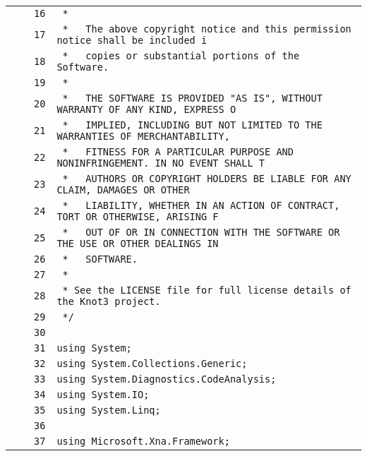 \documentclass[a4paper,10pt]{article}
\begin{document}
\begin{longtable}[l]{lrrl}
\cellcolor{gray} &  & \verb~16~ & \verb~ *~\\
\cellcolor{gray} &  & \verb~17~ & \verb~ *   The above copyright notice and this permission notice shall be included i~\\
\cellcolor{gray} &  & \verb~18~ & \verb~ *   copies or substantial portions of the Software.~\\
\cellcolor{gray} &  & \verb~19~ & \verb~ *~\\
\cellcolor{gray} &  & \verb~20~ & \verb~ *   THE SOFTWARE IS PROVIDED "AS IS", WITHOUT WARRANTY OF ANY KIND, EXPRESS O~\\
\cellcolor{gray} &  & \verb~21~ & \verb~ *   IMPLIED, INCLUDING BUT NOT LIMITED TO THE WARRANTIES OF MERCHANTABILITY,~\\
\cellcolor{gray} &  & \verb~22~ & \verb~ *   FITNESS FOR A PARTICULAR PURPOSE AND NONINFRINGEMENT. IN NO EVENT SHALL T~\\
\cellcolor{gray} &  & \verb~23~ & \verb~ *   AUTHORS OR COPYRIGHT HOLDERS BE LIABLE FOR ANY CLAIM, DAMAGES OR OTHER~\\
\cellcolor{gray} &  & \verb~24~ & \verb~ *   LIABILITY, WHETHER IN AN ACTION OF CONTRACT, TORT OR OTHERWISE, ARISING F~\\
\cellcolor{gray} &  & \verb~25~ & \verb~ *   OUT OF OR IN CONNECTION WITH THE SOFTWARE OR THE USE OR OTHER DEALINGS IN~\\
\cellcolor{gray} &  & \verb~26~ & \verb~ *   SOFTWARE.~\\
\cellcolor{gray} &  & \verb~27~ & \verb~ *~\\
\cellcolor{gray} &  & \verb~28~ & \verb~ * See the LICENSE file for full license details of the Knot3 project.~\\
\cellcolor{gray} &  & \verb~29~ & \verb~ */~\\
\cellcolor{gray} &  & \verb~30~ & \verb~~\\
\cellcolor{gray} &  & \verb~31~ & \verb~using System;~\\
\cellcolor{gray} &  & \verb~32~ & \verb~using System.Collections.Generic;~\\
\cellcolor{gray} &  & \verb~33~ & \verb~using System.Diagnostics.CodeAnalysis;~\\
\cellcolor{gray} &  & \verb~34~ & \verb~using System.IO;~\\
\cellcolor{gray} &  & \verb~35~ & \verb~using System.Linq;~\\
\cellcolor{gray} &  & \verb~36~ & \verb~~\\
\cellcolor{gray} &  & \verb~37~ & \verb~using Microsoft.Xna.Framework;~\\

\end{longtable}
\end{document}
